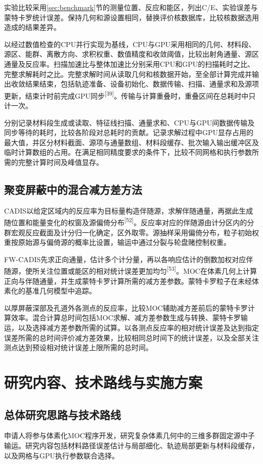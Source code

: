 \documentclass[UTF8, zihao=-4, fontset=none, a4paper]{ctexart}
\newcommand{\upcite}[1]{\textsuperscript{[#1]}}
\begin{document}
实验比较采用\ref{sec:benchmark}节的测量位置、反应和能区，列出C/E、实验误差与蒙特卡罗统计误差。保持几何和源设置相同，替换评价核数据库，比较核数据选用造成的结果差异。

以经过数值检查的CPU并行实现为基线，CPU与GPU采用相同的几何、材料段、源区、能群、离散方向、求积权重、数值精度和收敛阈值，比较出射角通量、源区通量及反应率。扫描加速比与整体加速比分别采用CPU和GPU的扫描耗时之比、完整求解耗时之比。完整求解时间从读取几何和核数据开始，至全部计算完成并输出收敛结果结束，包括轨迹准备、设备初始化、数据传输、扫描、通量求和及源项更新，结束计时前完成GPU同步\upcite{39}。传输与计算重叠时，重叠区间在总耗时中只计一次。

分别记录材料段生成或读取、特征线扫描、通量求和、CPU与GPU间数据传输及同步等待的耗时，比较各阶段对总耗时的贡献。记录求解过程中GPU显存占用的最大值，并区分材料截面、源项与通量数组、材料段缓存、批次输入输出缓冲区及临时计算数组的占用。在满足相同精度要求的条件下，比较不同网格和执行参数所需的完整计算时间及峰值显存。

\subsection{聚变屏蔽中的混合减方差方法}\label{sec:hybrid}
CADIS以给定区域内的反应率为目标量构造伴随源，求解伴随通量，再据此生成随位置和能量变化的权窗及源偏倚分布\upcite{52}。反应率对应的伴随源由计分区内的分群宏观反应截面及计分归一化确定，区外取零。源抽样采用偏倚分布，粒子初始权重按原始源与偏倚源的概率比设置，输运中通过分裂与轮盘赌控制权重。

FW-CADIS先求正向通量，估计多个计分量，再以各响应估计的倒数加权对应伴随源，使所关注位置或能区的相对统计误差更加均匀\upcite{53}。MOC在体素几何上计算正向与伴随通量，并生成蒙特卡罗计算所需的减方差参数。蒙特卡罗粒子在未经体素化的基准几何模型中追踪。

以厚屏蔽深部及孔道外各测点的反应率，比较MOC辅助减方差前后的蒙特卡罗计算效率。混合计算总时间包括MOC求解、减方差参数生成与转换、蒙特卡罗输运，以及选择减方差参数所需的试算。以各测点反应率的相对统计误差及达到指定误差所需的总时间评价减方差效果，比较相同总时间下的统计误差，以及全部关注测点达到预设相对统计误差上限所需的总时间。

\section{研究内容、技术路线与实施方案}\label{sec:5}
\subsection{总体研究思路与技术路线}
申请人将参与体素化MOC程序开发，研究复杂体素几何中的三维多群固定源中子输运。研究内容包括材料路径误差估计与局部细化、轨迹局部更新与材料段缓存，以及网格与GPU执行参数联合选择。
\end{document}
